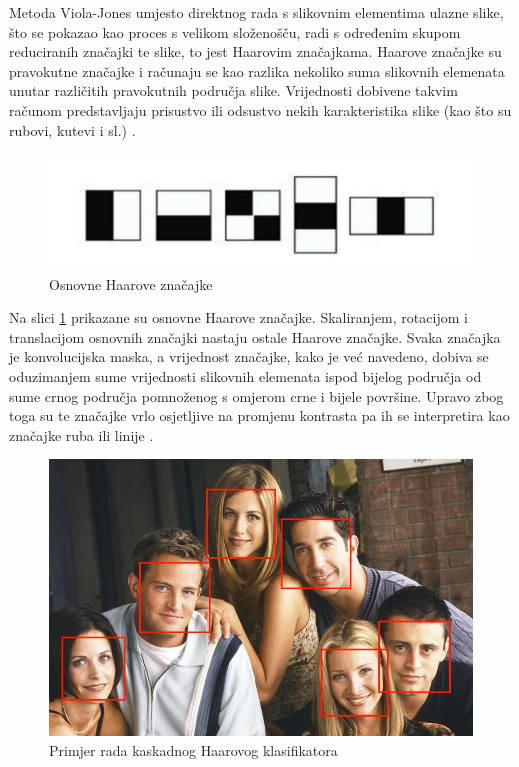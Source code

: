 \documentclass[times, utf8, zavrsni, numeric]{fer}
\begin{document}
Metoda Viola-Jones umjesto direktnog rada s slikovnim elementima ulazne slike, što se pokazao kao proces s velikom složenošču, radi s određenim skupom reduciranih značajki te slike, to jest Haarovim značajkama. Haarove značajke su pravokutne značajke i računaju se kao razlika nekoliko suma slikovnih elemenata unutar različitih pravokutnih područja slike. Vrijednosti dobivene takvim računom predstavljaju prisustvo ili odsustvo nekih karakteristika slike (kao što su rubovi, kutevi i sl.) \citep{culjakRad}.

\begin{figure}[htb]
    \centering
    \includegraphics[width=12cm]{images/haar.png}
    \caption{Osnovne Haarove značajke}
    \label{fig:haar}
\end{figure}

Na slici \ref{fig:haar} prikazane su osnovne Haarove značajke. Skaliranjem, rotacijom i translacijom osnovnih značajki nastaju ostale Haarove značajke. Svaka značajka je konvolucijska maska, a vrijednost značajke, kako je već navedeno, dobiva se oduzimanjem sume vrijednosti slikovnih elemenata ispod bijelog područja od sume crnog područja pomnoženog s omjerom crne i bijele površine. Upravo zbog toga su te značajke vrlo osjetljive na promjenu kontrasta pa ih se interpretira kao značajke ruba ili linije \citep{franicRad}.

\begin{figure}[htb]
    \centering
    \includegraphics[width=13cm]{images/friends.jpg}
    \caption{Primjer rada kaskadnog Haarovog klasifikatora}
    \label{fig:haar_cls}
\end{figure}
\end{document}
